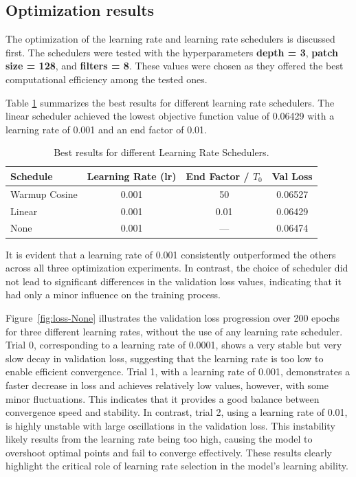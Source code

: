 \subsection{Optimization results}

The optimization of the learning rate and learning rate schedulers is discussed first. The schedulers were tested with the hyperparameters \textbf{depth = 3}, \textbf{patch size = 128}, and \textbf{filters = 8}. These values were chosen as they offered the best computational efficiency among the tested ones. 

Table \ref{tab:scheduler_results} summarizes the best results for different learning rate schedulers. The linear scheduler achieved the lowest objective function value of 0.06429 with a learning rate of 0.001 and an end factor of 0.01. 

\begin{table}[H]
    \centering
    \caption{Best results for different Learning Rate Schedulers.}
    \begin{tabular}{lccc}
        \toprule
        Schedule & Learning Rate (lr) & End Factor / \( T_0 \) & Val Loss \\
        \midrule
        Warmup Cosine & 0.001 & 50 & 0.06527 \\
        Linear & 0.001 & 0.01 & 0.06429 \\
        None & 0.001 & --- &  0.06474 \\
        \bottomrule
    \end{tabular}
    \label{tab:scheduler_results}
\end{table}

It is evident that a learning rate of 0.001 consistently outperformed the others across all three optimization experiments. In contrast, the choice of scheduler did not lead to significant differences in the validation loss values, indicating that it had only a minor influence on the training process.

Figure~\ref{fig:loss-None} illustrates the validation loss progression over 200 epochs for three different learning rates, without the use of any learning rate scheduler. Trial 0, corresponding to a learning rate of 0.0001, shows a very stable but very slow decay in validation loss, suggesting that the learning rate is too low to enable efficient convergence. Trial 1, with a learning rate of 0.001, demonstrates a faster decrease in loss and achieves relatively low values, however, with some minor fluctuations. This indicates that it provides a good balance between convergence speed and stability. In contrast, trial 2, using a learning rate of 0.01, is highly unstable with large oscillations in the validation loss. This instability likely results from the learning rate being too high, causing the model to overshoot optimal points and fail to converge effectively. These results clearly highlight the critical role of learning rate selection in the model’s learning ability.

